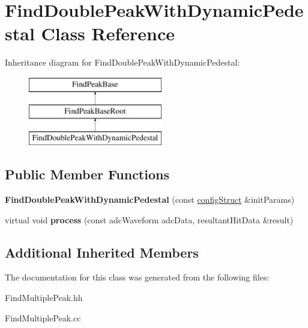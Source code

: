 \hypertarget{class_find_double_peak_with_dynamic_pedestal}{}\section{Find\+Double\+Peak\+With\+Dynamic\+Pedestal Class Reference}
\label{class_find_double_peak_with_dynamic_pedestal}
Inheritance diagram for Find\+Double\+Peak\+With\+Dynamic\+Pedestal\+:\begin{figure}[H]
\begin{center}
\leavevmode
\includegraphics[height=3.000000cm]{class_find_double_peak_with_dynamic_pedestal}
\end{center}
\end{figure}
\subsection*{Public Member Functions}
\begin{DoxyCompactItemize}
\item 
\hypertarget{class_find_double_peak_with_dynamic_pedestal_a3e911ccbe5da00980b273e7e063b06e9}{}{\bfseries Find\+Double\+Peak\+With\+Dynamic\+Pedestal} (const \hyperlink{structconfig_struct}{config\+Struct} \&init\+Params)\label{class_find_double_peak_with_dynamic_pedestal_a3e911ccbe5da00980b273e7e063b06e9}

\item 
\hypertarget{class_find_double_peak_with_dynamic_pedestal_a36ebd5c56d243eaf14b65775059306c0}{}virtual void {\bfseries process} (const adc\+Waveform adc\+Data, resultant\+Hit\+Data \&result)\label{class_find_double_peak_with_dynamic_pedestal_a36ebd5c56d243eaf14b65775059306c0}

\end{DoxyCompactItemize}
\subsection*{Additional Inherited Members}


The documentation for this class was generated from the following files\+:\begin{DoxyCompactItemize}
\item 
Find\+Multiple\+Peak.\+hh\item 
Find\+Multiple\+Peak.\+cc\end{DoxyCompactItemize}
